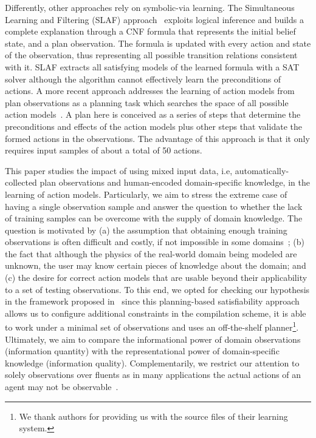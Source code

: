 \documentclass{article}
\newcommand{\SLAF}{{\small {\sffamily SLAF}}\xspace}
\begin{document}
Differently, other approaches rely on symbolic-via learning. The Simultaneous Learning and Filtering (\SLAF) approach~\cite{AmirC08} exploits logical inference and builds a complete explanation through a CNF formula that represents the initial belief state, and a plan observation. The formula is updated with every action and state of the observation, thus representing all possible transition relations consistent with it. \SLAF extracts all satisfying models of the learned formula with a SAT solver although the algorithm cannot effectively learn the preconditions of actions. A more recent approach addresses the learning of action models from plan observations as a planning task which searches the space of all possible action models~\cite{aineto2018learning}. A plan here is conceived as a series of steps that determine the preconditions and effects of the action models plus other steps that validate the formed actions in the observations. The advantage of this approach is that it only requires input samples of about a total of 50 actions.

This paper studies the impact of using mixed input data, i.e, automatically-collected plan observations and human-encoded domain-specific knowledge, in the learning of action models. Particularly, we aim to stress the extreme case of having a single observation sample and answer the question to whether the lack of training samples can be overcome with the supply of domain knowledge. The question is motivated by (a) the assumption that obtaining enough training observations is often difficult and costly, if not impossible in some domains~\cite{Zhuo15}; (b) the fact that although the physics of the real-world domain being modeled are unknown, the user may know certain pieces of knowledge about the domain; and (c) the desire for correct action models that are usable beyond their applicability to a set of testing observations. To this end, we opted for checking our hypothesis in the framework proposed in~\cite{aineto2018learning} since this planning-based satisfiability approach allows us to configure additional constraints in the compilation scheme, it is able to work under a minimal set of observations and uses an off-the-shelf planner\footnote{We thank authors for providing us with the source files of their learning system.}. Ultimately, we aim to compare the informational power of domain observations (information quantity) with the representational power of domain-specific knowledge (information quality). Complementarily, we restrict our attention to solely observations over fluents as in many applications the actual actions of an agent may not be observable~\cite{SohrabiRU16}.
\end{document}
